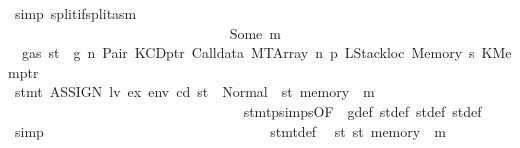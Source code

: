 \begin{isabellebody}
\ {\isacharparenleft}{\kern0pt}simp\ split{\isacharcolon}{\kern0pt}if{\isacharunderscore}{\kern0pt}split{\isacharunderscore}{\kern0pt}asm{\isacharparenright}{\kern0pt}\isanewline
\ \ \ \ \ \ \ \ \ \ \ \ \ \ \ \ \ \ \ \ \ \ \ \ \ \ \ \ \isamarkupfalse%
\isanewline
\ \ \ \ \ \ \ \ \ \ \ \ \ \ \ \ \ \ \ \ \ \ \ \ \ \ \ \ \ \ \isamarkupfalse%
\ {\isacharparenleft}{\kern0pt}Some\ m{\isacharprime}{\kern0pt}{\isacharparenright}{\kern0pt}\isanewline
\ \ \ \ \ \ \ \ \ \ \ \ \ \ \ \ \ \ \ \ \ \ \ \ \ \ \ \ \ \ \isamarkupfalse%
\ {\isacharbackquoteopen}{\isasymnot}\ gas\ st\ {\isasymle}\ g{\isacharbackquoteclose}\ n\ Pair\ KCDptr\ Calldata\ MTArray\ n{}\ p{}\ LStackloc\ Memory\ s{}\ KMemptr\isanewline
\ \ \ \ \ \ \ \ \ \ \ \ \ \ \ \ \ \ \ \ \ \ \ \ \ \ \ \ \ \ \isamarkupfalse%
\ {\isachardoublequoteopen}stmt\ {\isacharparenleft}{\kern0pt}ASSIGN\ lv\ ex{\isacharparenright}{\kern0pt}\ env\ cd\ st\ {\isacharequal}{\kern0pt}\ Normal\ {\isacharparenleft}{\kern0pt}{\isacharparenleft}{\kern0pt}{\isacharparenright}{\kern0pt}{\isacharcomma}{\kern0pt}\ st{\isacharprime}{\kern0pt}{\isacharprime}{\kern0pt}{\isacharprime}{\kern0pt}\ {\isasymlparr}memory\ {\isacharcolon}{\kern0pt}{\isacharequal}{\kern0pt}\ m{\isacharprime}{\kern0pt}{\isasymrparr}{\isacharparenright}{\kern0pt}{\isachardoublequoteclose}\isanewline
\ \ \ \ \ \ \ \ \ \ \ \ \ \ \ \ \ \ \ \ \ \ \ \ \ \ \ \ \ \ \ \ \isamarkupfalse%
\ stmt{\isachardot}{\kern0pt}psimps{\isacharparenleft}{\kern0pt}{}{\isacharparenright}{\kern0pt}{\isacharbrackleft}{\kern0pt}OF\ {}{\isacharparenleft}{\kern0pt}{}{\isacharparenright}{\kern0pt}{\isacharbrackright}{\kern0pt}\ g{\isacharunderscore}{\kern0pt}def\ st{\isacharprime}{\kern0pt}{\isacharunderscore}{\kern0pt}def\ st{\isacharprime}{\kern0pt}{\isacharprime}{\kern0pt}{\isacharunderscore}{\kern0pt}def\ st{\isacharprime}{\kern0pt}{\isacharprime}{\kern0pt}{\isacharprime}{\kern0pt}{\isacharunderscore}{\kern0pt}def\ \isamarkupfalse%
\ simp\isanewline
\ \ \ \ \ \ \ \ \ \ \ \ \ \ \ \ \ \ \ \ \ \ \ \ \ \ \ \ \ \ \isamarkupfalse%
\ stmt{\isacharunderscore}{\kern0pt}def\ \isamarkupfalse%
\ {\isachardoublequoteopen}st{}{\isacharprime}{\kern0pt}{\isacharequal}{\kern0pt}\ st{\isacharprime}{\kern0pt}{\isacharprime}{\kern0pt}{\isacharprime}{\kern0pt}\ {\isasymlparr}memory\ {\isacharcolon}{\kern0pt}{\isacharequal}{\kern0pt}\ m{\isacharprime}{\kern0pt}{\isasymrparr}{\isachardoublequoteclose}\ \isamarkupfalse%

\end{isabellebody}
